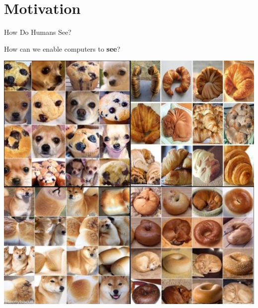 \documentclass[default, aspectratio=169]{beamer}
\begin{document}
	 \section{Motivation}
	\begin{frame}{How Do Humans See?}
		
		How can we enable computers to \textbf{see}?
		\begin{center}
			\includegraphics[keepaspectratio, scale=0.334]{pic/how.png}

\end{center}
\end{frame}
\end{document}
